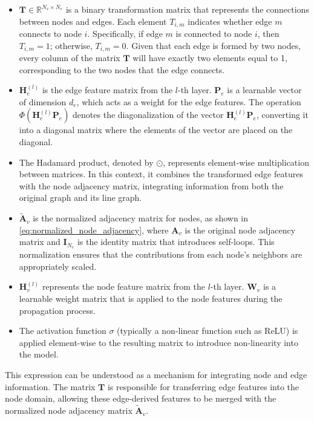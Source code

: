 \begin{itemize}
    \item \( \mathbf{T} \in \mathbb{R}^{N_v \times N_e} \) is a binary transformation matrix that represents the connections between nodes and edges. Each element \( T_{i,m} \) indicates whether edge \( m \) connects to node \( i \). Specifically, if edge \( m \) is connected to node \( i \), then \( T_{i,m} = 1 \); otherwise, \( T_{i,m} = 0 \). Given that each edge is formed by two nodes, every column of the matrix \( \mathbf{T} \) will have exactly two elements equal to 1, corresponding to the two nodes that the edge connects. 
    \item \( \mathbf{H}^{(l)}_e \) is the edge feature matrix from the \( l \)-th layer. \( \mathbf{P}_e \) is a learnable vector of dimension \( d_e \), which acts as a weight for the edge features. The operation \( \Phi(\mathbf{H}^{(l)}_e \mathbf{P}_e) \) denotes the diagonalization of the vector \( \mathbf{H}^{(l)}_e \mathbf{P}_e \), converting it into a diagonal matrix where the elements of the vector are placed on the diagonal. 
    \item The Hadamard product, denoted by \( \odot \), represents element-wise multiplication between matrices. In this context, it combines the transformed edge features with the node adjacency matrix, integrating information from both the original graph and its line graph.
    \item \( \tilde{\mathbf{A}}_v\) is the normalized adjacency matrix for nodes, as shown in \cref{eq:normalized_node_adjacency}, where \( \mathbf{A}_v \) is the original node adjacency matrix and \( \mathbf{I}_{N_v} \) is the identity matrix that introduces self-loops. This normalization ensures that the contributions from each node's neighbors are appropriately scaled. 
    \item \( \mathbf{H}^{(l)}_v \) represents the node feature matrix from the \( l \)-th layer. \( \mathbf{W}_v \) is a learnable weight matrix that is applied to the node features during the propagation process. 
    \item The activation function \( \sigma \) (typically a non-linear function such as ReLU) is applied element-wise to the resulting matrix to introduce non-linearity into the model.
\end{itemize}


This expression can be understood as a mechanism for integrating node and edge information. The matrix \( \mathbf{T} \) is responsible for transferring edge features into the node domain, allowing these edge-derived features to be merged with the normalized node adjacency matrix \( \tilde{\mathbf{A}}_v \). 




